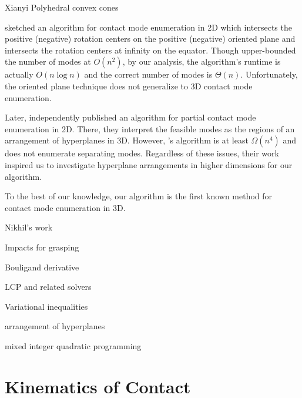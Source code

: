\documentclass[conference]{IEEEtran}
\newcommand{\TODO}[1]{{\color{red} {{#1}}}}
\begin{document}
\begin{inparaenum}
    \item \TODO{Xianyi} Polyhedral convex cones
    \item \citet{mason_mechanics_2001} sketched an algorithm for contact mode
    enumeration in 2D which intersects the positive (negative) rotation centers
    on the positive (negative) oriented plane and intersects the rotation
    centers at infinity on the equator. Though \citet{mason_mechanics_2001}
    upper-bounded the number of modes at $O(n^2)$, by our analysis, the
    algorithm's runtime is actually $O(n\log n)$ and the correct number of modes
    is $\Theta(n)$. Unfortunately, the oriented plane technique does not
    generalize to 3D contact mode enumeration.
    \item Later, \citet{haas-heger_passive_2018} independently published an
    algorithm for partial contact mode enumeration in 2D. There, they interpret
    the feasible modes as the regions of an arrangement of hyperplanes in 3D.
    However, \citet{haas-heger_passive_2018}'s algorithm is at least
    $\Omega(n^4)$ and does not enumerate separating modes. Regardless of these
    issues, their work inspired us to investigate hyperplane arrangements in
    higher dimensions for our algorithm.
    \item To the best of our knowledge, our algorithm is the first known method
    for contact mode enumeration in 3D.
    \item Nikhil's work
    \item Impacts for grasping
    \item Bouligand derivative
    \item LCP and related solvers
    \item Variational inequalities
    \item arrangement of hyperplanes
    \item mixed integer quadratic programming
\end{inparaenum}

\section{Kinematics of Contact}

\end{document}
